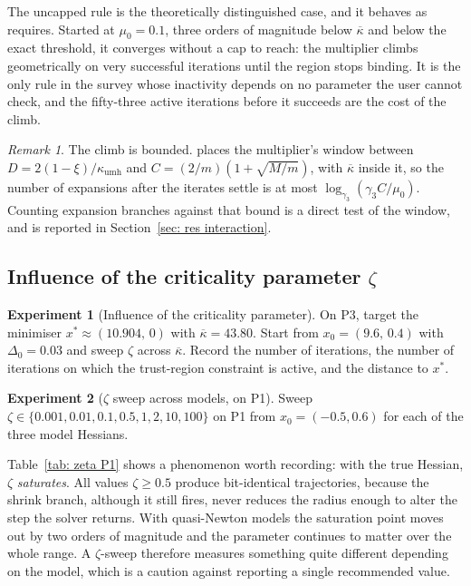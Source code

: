\documentclass[11pt]{article}
\theoremstyle{plain}
\theoremstyle{definition}
\newtheorem{experiment}{Experiment}
\theoremstyle{remark}
\newtheorem{remark}[theorem]{Remark}
\numberwithin{equation}{section}
\newcommand*\mykappa[1]{\kappa_{\scriptscriptstyle\text{#1}}}
\newcommand{\kumh}{\mykappa{umh}}
\providecommand{\kbar}{\overline{\kappa}}
\providecommand{\kbar}{\overline{\kappa}}
\begin{document}
The uncapped rule is the theoretically distinguished case, and it behaves as
\PartII{} requires. Started at $\mu_0 = 0.1$, three orders of magnitude below
$\kbar$ and below the exact threshold, it converges without a cap to reach: the
multiplier climbs geometrically on very successful iterations until the region
stops binding. It is the only rule in the survey whose inactivity depends on no
parameter the user cannot check, and the fifty-three active iterations before it
succeeds are the cost of the climb.

\begin{remark}
The climb is bounded. \PartII{} places the multiplier's window between
$D = 2(1-\xi)/\kumh$ and $C = (2/m)(1+\sqrt{M/m})$, with $\kbar$ inside it, so
the number of expansions after the iterates settle is at most
$\log_{\gamma_3}(\gamma_3 C/\mu_0)$. Counting expansion branches against that
bound is a direct test of the window, and is reported in
Section~\ref{sec: res interaction}.\provisional
\end{remark}


\subsection{Influence of the criticality parameter \texorpdfstring{$\zeta$}{zeta}}
\label{sec: exp zeta}

\begin{experiment}[Influence of the criticality parameter]
\label{exp: zeta}
On P3, target the minimiser $x^* \approx (10.904,\,0)$ with
$\overline{\kappa} = 43.80$. Start from $x_0 = (9.6,\,0.4)$ with $\Delta_0 = 0.03$ and sweep
$\zeta$ across $\overline{\kappa}$. Record the number of iterations, the number of iterations on
which the trust-region constraint is active, and the distance to $x^*$.
\end{experiment}

\begin{experiment}[$\zeta$ sweep across models, on P1]
\label{exp: zeta P1}
Sweep $\zeta \in \{0.001, 0.01, 0.1, 0.5, 1, 2, 10, 100\}$ on P1 from $x_0 = (-0.5, 0.6)$ for
each of the three model Hessians.
\end{experiment}

Table~\ref{tab: zeta P1} shows a phenomenon worth recording: with the true Hessian, $\zeta$
\emph{saturates}. All values $\zeta \geq 0.5$ produce bit-identical trajectories, because the
shrink branch, although it still fires, never reduces the radius enough to alter the step the
solver returns. With quasi-Newton models the saturation point moves out by two orders of
magnitude and the parameter continues to matter over the whole range. A $\zeta$-sweep therefore
measures something quite different depending on the model, which is a caution against reporting
a single recommended value.
\end{document}
